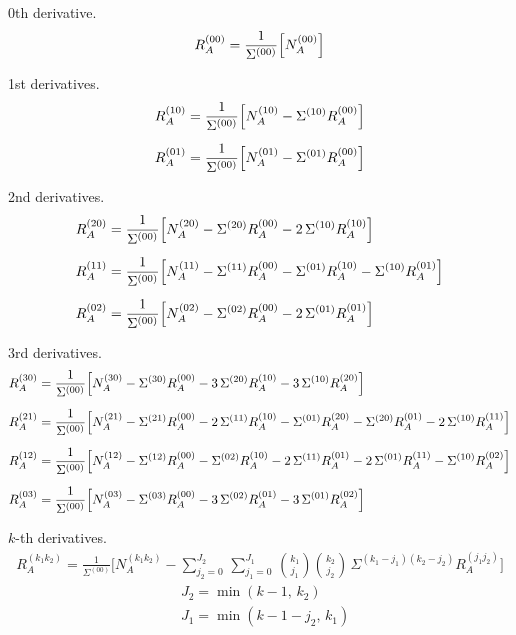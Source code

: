 \documentclass[oneside, english, reqno]{amsart}
\theoremstyle{plain}
\theoremstyle{plain}
\theoremstyle{plain}
\theoremstyle{plain}
\theoremstyle{definition}
\theoremstyle{definition}
\theoremstyle{definition}
\numberwithin{equation}{section}
\begin{document}
\noindent 0th derivative.
\begin{align*}
	R_{A}^{(00)} = \frac{1}{\Sigma^{(00)}}\Bigl[N_{A}^{(00)}\Bigr]
\end{align*} \vspace{3pt}

\noindent 1st derivatives.
\begin{align*}
	&R_{A}^{(10)} = \frac{1}{\Sigma^{(00)}}\Bigl[N_{A}^{(10)} - \Sigma^{(10)}R_{A}^{(00)}\Bigr] \\[6pt]
	&R_{A}^{(01)} = \frac{1}{\Sigma^{(00)}}\Bigl[N_{A}^{(01)} - \Sigma^{(01)}R_{A}^{(00)}\Bigr]
\end{align*} \vspace{3pt}

\noindent 2nd derivatives.
\begin{align*}
	&R_{A}^{(20)} = \frac{1}{\Sigma^{(00)}}\Bigl[N_{A}^{(20)} - \Sigma^{(20)}R_{A}^{(00)} - 2\,\Sigma^{(10)}R_{A}^{(10)}\Bigr] \\[6pt]
	&R_{A}^{(11)} = \frac{1}{\Sigma^{(00)}}\Bigl[N_{A}^{(11)} - \Sigma^{(11)}R_{A}^{(00)} - \Sigma^{(01)}R_{A}^{(10)} - \Sigma^{(10)}R_{A}^{(01)}\Bigr] \\[6pt]
	&R_{A}^{(02)} = \frac{1}{\Sigma^{(00)}}\Bigl[N_{A}^{(02)} - \Sigma^{(02)}R_{A}^{(00)} - 2\,\Sigma^{(01)}R_{A}^{(01)}\Bigr]
\end{align*} \vspace{3pt}

\noindent 3rd derivatives.
\begin{align*}
	&R_{A}^{(30)} = \frac{1}{\Sigma^{(00)}}\Bigl[N_{A}^{(30)} - \Sigma^{(30)}R_{A}^{(00)} - 3\,\Sigma^{(20)}R_{A}^{(10)} - 3\,\Sigma^{(10)}R_{A}^{(20)}\Bigr] \\[6pt]
	&R_{A}^{(21)} = \frac{1}{\Sigma^{(00)}}\Bigl[N_{A}^{(21)} - \Sigma^{(21)}R_{A}^{(00)} - 2\,\Sigma^{(11)}R_{A}^{(10)} - \Sigma^{(01)}R_{A}^{(20)} - \Sigma^{(20)}R_{A}^{(01)} - 2\,\Sigma^{(10)}R_{A}^{(11)} \Bigr] \\[6pt]
	&R_{A}^{(12)} = \frac{1}{\Sigma^{(00)}}\Bigl[N_{A}^{(12)} - \Sigma^{(12)}R_{A}^{(00)} - \Sigma^{(02)}R_{A}^{(10)} - 2\,\Sigma^{(11)}R_{A}^{(01)} - 2\,\Sigma^{(01)}R_{A}^{(11)} - \Sigma^{(10)}R_{A}^{(02)}\Bigr] \\[6pt]
	&R_{A}^{(03)} = \frac{1}{\Sigma^{(00)}}\Bigl[N_{A}^{(03)} - \Sigma^{(03)}R_{A}^{(00)} - 3\,\Sigma^{(02)}R_{A}^{(01)} - 3\,\Sigma^{(01)}R_{A}^{(02)}\Bigr]
\end{align*} \vspace{3pt}

\noindent \(k\)-th derivatives.
\begin{align*}
	R_{A}^{(k_{1}k_{2})} = \frac{1}{\Sigma^{(00)}}\Biggl[N_{A}^{(k_{1}k_{2})} - \sum_{j_{2} = 0}^{J_{2}}\,\sum_{j_{1} = 0}^{J_{1}}\,\binom{k_{1}}{j_{1}}\binom{k_{2}}{j_{2}}\,\Sigma^{(k_{1} - j_{1})(k_{2} - j_{2})}R_{A}^{(j_{1}j_{2})}\Biggr]
\end{align*}
\begin{align*}
	&J_{2} = \min(k - 1,\,k_{2}) \\[6pt]
	&J_{1} = \min(k - 1 - j_{2},\,k_{1})
\end{align*}
\end{document}
